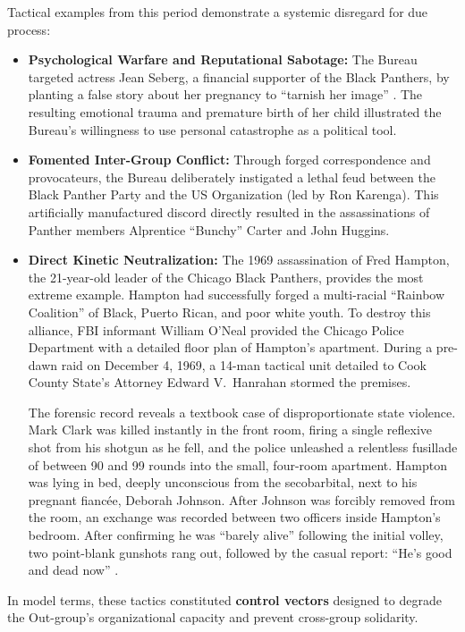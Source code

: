 Tactical examples from this period demonstrate a systemic disregard for due process:
\begin{itemize}
    \item \textbf{Psychological Warfare and Reputational Sabotage:} The Bureau targeted actress Jean Seberg, a financial supporter of the Black Panthers, by planting a false story about her pregnancy to ``tarnish her image'' \cite{fbi_cointelpro_vault}. The resulting emotional trauma and premature birth of her child illustrated the Bureau's willingness to use personal catastrophe as a political tool.
    \item \textbf{Fomented Inter-Group Conflict:} Through forged correspondence and provocateurs, the Bureau deliberately instigated a lethal feud between the Black Panther Party and the US Organization (led by Ron Karenga). This artificially manufactured discord directly resulted in the assassinations of Panther members Alprentice ``Bunchy'' Carter and John Huggins.
    \item \textbf{Direct Kinetic Neutralization:} The 1969 assassination of Fred Hampton, the 21-year-old leader of the Chicago Black Panthers, provides the most extreme example. Hampton had successfully forged a multi-racial ``Rainbow Coalition'' of Black, Puerto Rican, and poor white youth. To destroy this alliance, FBI informant William O'Neal provided the Chicago Police Department with a detailed floor plan of Hampton's apartment. During a pre-dawn raid on December 4, 1969, a 14-man tactical unit detailed to Cook County State's Attorney Edward V.\ Hanrahan stormed the premises.

    The forensic record reveals a textbook case of disproportionate state violence. Mark Clark was killed instantly in the front room, firing a single reflexive shot from his shotgun as he fell, and the police unleashed a relentless fusillade of between 90 and 99 rounds into the small, four-room apartment. Hampton was lying in bed, deeply unconscious from the secobarbital, next to his pregnant fianc\'{e}e, Deborah Johnson. After Johnson was forcibly removed from the room, an exchange was recorded between two officers inside Hampton's bedroom. After confirming he was ``barely alive'' following the initial volley, two point-blank gunshots rang out, followed by the casual report: ``He's good and dead now'' \cite{hampton_bio}.
\end{itemize}

In model terms, these tactics constituted \textbf{control vectors} designed to degrade the Out-group's organizational capacity and prevent cross-group solidarity.

